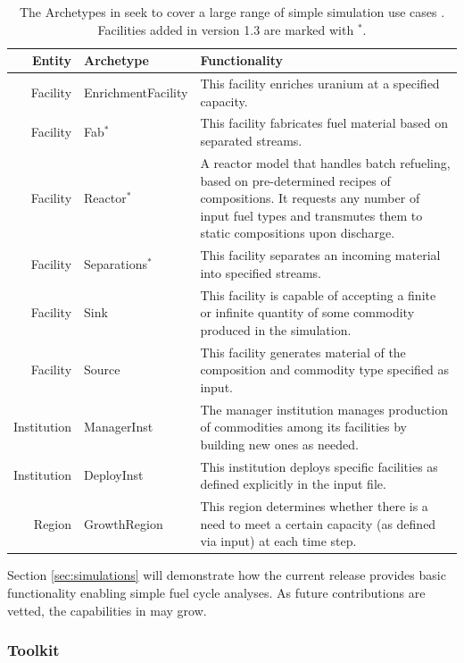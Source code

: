 \begin{table}[htb]
\centering
\begin{tabularx}{\textwidth}{rlX}
\hline
\textbf{Entity} & \textbf{Archetype} & \textbf{Functionality} \\
\hline
Facility & EnrichmentFacility & This facility enriches uranium at a specified capacity. \\
Facility & Fab$^*$ & This facility fabricates fuel material based on separated streams. \\
Facility & Reactor$^*$ & A reactor model that handles batch refueling, based on pre-determined recipes of compositions. It requests any number of input fuel types and transmutes them to static compositions upon discharge.\\
Facility & Separations$^*$ & This facility separates an incoming material into specified streams. \\
Facility & Sink & This facility is capable of accepting a finite or infinite quantity of some commodity produced in the simulation. \\
Facility & Source & This facility generates material of the composition and commodity type specified as input.  \\
Institution & ManagerInst & The manager institution manages production of commodities among its facilities by building new ones as needed. \\
Institution & DeployInst &  This institution deploys specific facilities as defined explicitly in the input file. \\
Region & GrowthRegion & This region determines whether there is a need to meet a certain capacity (as defined via input) at each time step. \\
\hline
\end{tabularx}
\caption{The Archetypes in \Cycamore seek to cover a large range of simple
simulation use cases \cite{carlsen_cycamore_2014}. Facilities added in version
1.3 are marked with $^*$.}
\label{tab:cycamore}
\end{table}

Section \ref{sec:simulations} will demonstrate how the current \Cycamore
release provides basic functionality enabling simple fuel cycle analyses. As
future contributions are vetted, the capabilities in \Cycamore may grow.

\subsubsection{Toolkit}

